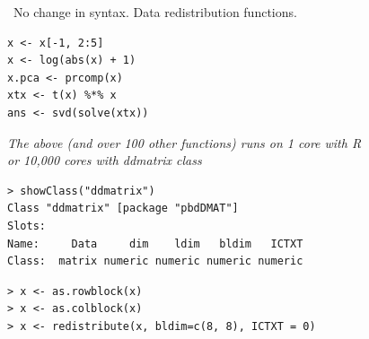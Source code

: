 \begin{frame}[fragile]
  \begin{block}{\pbdR\ No change in syntax. \hfill Data redistribution functions.}
\vspace{-2ex}
  \begin{lstlisting}
x <- x[-1, 2:5]
x <- log(abs(x) + 1)
x.pca <- prcomp(x)
xtx <- t(x) %*% x
ans <- svd(solve(xtx))
  \end{lstlisting}
\vspace{-1ex}
  \begin{center}
  \emph{The above (and over 100 other functions) runs on 1 core with R \\
    or 10,000 cores with \pbdR ddmatrix class}
  \end{center}
\vspace{-2ex}
\begin{lstlisting}
> showClass("ddmatrix")
Class "ddmatrix" [package "pbdDMAT"]
Slots:
Name:     Data     dim    ldim   bldim   ICTXT
Class:  matrix numeric numeric numeric numeric
\end{lstlisting}
\vspace{-2ex}
\begin{lstlisting}
> x <- as.rowblock(x)
> x <- as.colblock(x)
> x <- redistribute(x, bldim=c(8, 8), ICTXT = 0)
\end{lstlisting}
  \end{block}
\end{frame}





